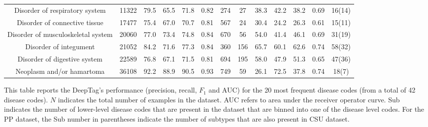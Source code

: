\begin{table*}[h]
\begin{adjustwidth}{-0.5in}{0in}
\begin{tabular}{c | c c c c c c | c c c c c c }
Disorder of respiratory system & 11322 & 79.5 & 65.5 & 71.8 & 0.82 & 274 & 27 & 38.3 & 42.2 & 38.2 & 0.69 & 16(14) \\
Disorder of connective tissue & 17477 & 75.4 & 67.0 & 70.7 & 0.81 & 567 & 24 & 30.4 & 24.2 & 26.3 & 0.61 & 15(11) \\
Disorder of musculoskeletal system & 20060 & 77.0 & 73.4 & 74.8 & 0.84 & 670 & 56 & 54.0 & 41.4 & 46.1 & 0.69 & 31(19) \\
Disorder of integument & 21052 & 84.2 & 71.6 & 77.3 & 0.84 & 360 & 156 & 65.7 & 60.1 & 62.6 & 0.74 & 58(32) \\
Disorder of digestive system & 22589 & 76.8 & 67.1 & 71.5 & 0.81 & 694 & 195 & 58.0 & 47.9 & 51.3 & 0.65 & 47(36) \\
Neoplasm and/or hamartoma & 36108 & 92.2 & 88.9 & 90.5 & 0.93 & 749 & 59 & 26.1 & 72.5 & 37.8 & 0.74 & 18(7) \\
\bottomrule
\end{tabular}
\begin{flushleft} This table reports the DeepTag's performance (precision, recall, $F_1$ and AUC) for the 20 most frequent disease codes (from a total of 42 disease codes). $N$ indicates the total number of examples in the dataset. AUC refers to area under the receiver operator curve. Sub indicates the number of lower-level disease codes that are present in the dataset that are binned into one of the disease level codes. For the PP dataset, the Sub number in parentheses indicate the number of subtypes that are also present in CSU dataset. 
\end{flushleft}
 \label{tab:detailed-csu-pp}
\end{adjustwidth}
\end{table*}
